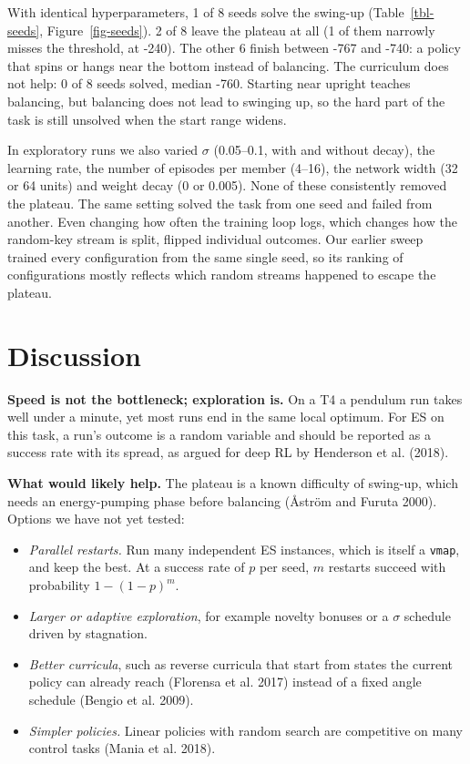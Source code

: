 \documentclass[
]{article}
\providecommand{\tightlist}{%
  \setlength{\itemsep}{0pt}\setlength{\parskip}{0pt}}
\begin{document}
With identical hyperparameters, 1 of 8 seeds solve the swing-up
(Table~\ref{tbl-seeds}, Figure~\ref{fig-seeds}). 2 of 8 leave the
plateau at all (1 of them narrowly misses the threshold, at -240). The
other 6 finish between -767 and -740: a policy that spins or hangs near
the bottom instead of balancing. The curriculum does not help: 0 of 8
seeds solved, median -760. Starting near upright teaches balancing, but
balancing does not lead to swinging up, so the hard part of the task is
still unsolved when the start range widens.

In exploratory runs we also varied \(\sigma\) (0.05--0.1, with and
without decay), the learning rate, the number of episodes per member
(4--16), the network width (32 or 64 units) and weight decay (0 or
0.005). None of these consistently removed the plateau. The same setting
solved the task from one seed and failed from another. Even changing how
often the training loop logs, which changes how the random-key stream is
split, flipped individual outcomes. Our earlier sweep trained every
configuration from the same single seed, so its ranking of
configurations mostly reflects which random streams happened to escape
the plateau.

\section{Discussion}\label{discussion}

\textbf{Speed is not the bottleneck; exploration is.} On a T4 a pendulum
run takes well under a minute, yet most runs end in the same local
optimum. For ES on this task, a run's outcome is a random variable and
should be reported as a success rate with its spread, as argued for deep
RL by Henderson et al. (2018).

\textbf{What would likely help.} The plateau is a known difficulty of
swing-up, which needs an energy-pumping phase before balancing (Åström
and Furuta 2000). Options we have not yet tested:

\begin{itemize}
\tightlist
\item
  \emph{Parallel restarts.} Run many independent ES instances, which is
  itself a \texttt{vmap}, and keep the best. At a success rate of \(p\)
  per seed, \(m\) restarts succeed with probability \(1-(1-p)^m\).
\item
  \emph{Larger or adaptive exploration}, for example novelty bonuses or
  a \(\sigma\) schedule driven by stagnation.
\item
  \emph{Better curricula}, such as reverse curricula that start from
  states the current policy can already reach (Florensa et al. 2017)
  instead of a fixed angle schedule (Bengio et al. 2009).
\item
  \emph{Simpler policies.} Linear policies with random search are
  competitive on many control tasks (Mania et al. 2018).
\end{itemize}
\end{document}
